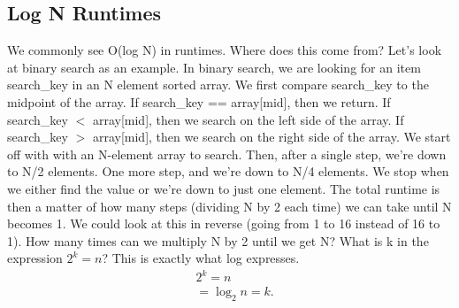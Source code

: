 \documentclass{report}
\begin{document}
    \subsection{Log N Runtimes}
    \bigbreak \noindent 
    We commonly see O(log N) in runtimes. Where does this come from?
    \bigbreak \noindent 
    Let’s look at binary search as an example. In binary search, we are looking for an item search\_key in an N element sorted array. We first compare search\_key to the midpoint of the array. If search_key == array[mid], then we return. If search_key $<$ array[mid], then we search on the left side of the array. If search_key $>$ array[mid], then we search on the right side of the array.
    \bigbreak \noindent 
    We start off with with an N-element array to search. Then, after a single step, we’re down to N/2 elements. One more step, and we’re down to N/4 elements. We stop when we either find the value
    \bigbreak \noindent 
    or we’re down to just one element. The total runtime is then a matter of how many steps (dividing N by 2 each time) we can take until N becomes 1.
    \bigbreak \noindent 
    We could look at this in reverse (going from 1 to 16 instead of 16 to 1). How many times can we multiply N by 2 until we get N?
    \bigbreak \noindent 
    What is k in the expression $2^{k} = n$? This is exactly what log expresses.
    \begin{align*}
        &2^{k} = n \\
        &=\log_{2}{n} = k
    .\end{align*}

    \bigbreak \noindent 
\end{document}
